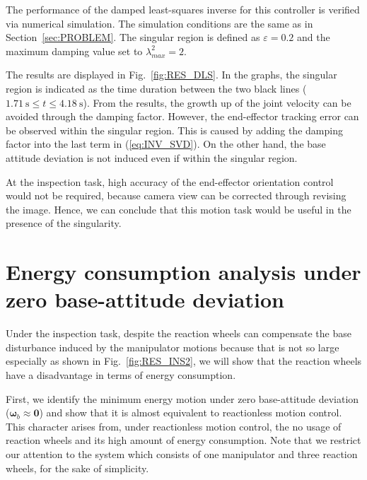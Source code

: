 \documentclass[preprint,12pt]{elsarticle}
\def\fig#1{{Fig.~\ref{fig:#1}}}
\def\eq#1{{(\ref{eq:#1})}}
\def\sec#1{{Section~\ref{sec:#1}}}
\def\unit#1{{~\mathrm{#1}}}
\begin{document}
The performance of the damped least-squares inverse for this controller
is verified via numerical simulation.
The simulation conditions are the same as in \sec{PROBLEM}.
The singular region is defined as $\varepsilon = 0.2$ and
the maximum damping value set to $\lambda_{max}^{2} = 2$.

The results are displayed in \fig{RES_DLS}.
In the graphs, the singular region is indicated as the time duration 
between the two black lines ($1.71\unit{s} \leq t \leq 4.18\unit{s}$).
From the results,
the growth up of the joint velocity can be avoided through the damping factor.
However, the end-effector tracking error can be observed within the singular region.
This is caused by adding the damping factor into the last term in \eq{INV_SVD}.
On the other hand,
the base attitude deviation is not induced even if within the singular region.

At the inspection task,
high accuracy of the end-effector orientation control would not be required,
because camera view can be corrected through revising the image.
Hence, we can conclude that this motion task would be useful in the presence of the singularity.


\section{Energy consumption analysis under 
  zero base-attitude deviation}
\label{sec:ENERGY}
Under the inspection task,
despite the reaction wheels can compensate the base disturbance induced by the manipulator motions
because that is not so large especially as shown in \fig{RES_INS2},
we will show that the reaction wheels have a disadvantage in terms of energy consumption.

First, we identify the minimum energy motion under zero base-attitude deviation ($\bm{\omega}_{b} \approx \bm{0}$) and
show that it is almost equivalent to reactionless motion control.
This character arises from, under reactionless motion control, the no usage of reaction wheels and its high amount of energy consumption.
Note that we restrict our attention to the system which consists of
one manipulator and three reaction wheels, for the sake of simplicity.

\end{document}
